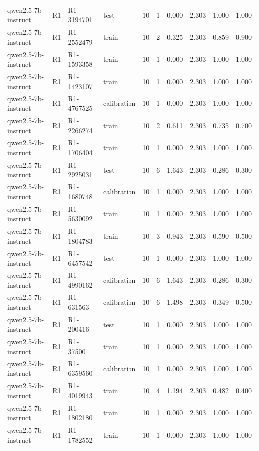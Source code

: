 \begin{table}
\begin{tabular}{llllrrrrrr}
qwen2.5-7b-instruct & R1 & R1-3194701 & test & 10 & 1 & 0.000 & 2.303 & 1.000 & 1.000 \\
qwen2.5-7b-instruct & R1 & R1-2552479 & train & 10 & 2 & 0.325 & 2.303 & 0.859 & 0.900 \\
qwen2.5-7b-instruct & R1 & R1-1593358 & train & 10 & 1 & 0.000 & 2.303 & 1.000 & 1.000 \\
qwen2.5-7b-instruct & R1 & R1-1423107 & train & 10 & 1 & 0.000 & 2.303 & 1.000 & 1.000 \\
qwen2.5-7b-instruct & R1 & R1-4767525 & calibration & 10 & 1 & 0.000 & 2.303 & 1.000 & 1.000 \\
qwen2.5-7b-instruct & R1 & R1-2266274 & train & 10 & 2 & 0.611 & 2.303 & 0.735 & 0.700 \\
qwen2.5-7b-instruct & R1 & R1-1706404 & train & 10 & 1 & 0.000 & 2.303 & 1.000 & 1.000 \\
qwen2.5-7b-instruct & R1 & R1-2925031 & test & 10 & 6 & 1.643 & 2.303 & 0.286 & 0.300 \\
qwen2.5-7b-instruct & R1 & R1-1680748 & calibration & 10 & 1 & 0.000 & 2.303 & 1.000 & 1.000 \\
qwen2.5-7b-instruct & R1 & R1-5630092 & train & 10 & 1 & 0.000 & 2.303 & 1.000 & 1.000 \\
qwen2.5-7b-instruct & R1 & R1-1804783 & train & 10 & 3 & 0.943 & 2.303 & 0.590 & 0.500 \\
qwen2.5-7b-instruct & R1 & R1-6457542 & test & 10 & 1 & 0.000 & 2.303 & 1.000 & 1.000 \\
qwen2.5-7b-instruct & R1 & R1-4990162 & calibration & 10 & 6 & 1.643 & 2.303 & 0.286 & 0.300 \\
qwen2.5-7b-instruct & R1 & R1-631563 & calibration & 10 & 6 & 1.498 & 2.303 & 0.349 & 0.500 \\
qwen2.5-7b-instruct & R1 & R1-200416 & test & 10 & 1 & 0.000 & 2.303 & 1.000 & 1.000 \\
qwen2.5-7b-instruct & R1 & R1-37500 & train & 10 & 1 & 0.000 & 2.303 & 1.000 & 1.000 \\
qwen2.5-7b-instruct & R1 & R1-6359560 & calibration & 10 & 1 & 0.000 & 2.303 & 1.000 & 1.000 \\
qwen2.5-7b-instruct & R1 & R1-4019943 & train & 10 & 4 & 1.194 & 2.303 & 0.482 & 0.400 \\
qwen2.5-7b-instruct & R1 & R1-1802180 & train & 10 & 1 & 0.000 & 2.303 & 1.000 & 1.000 \\
qwen2.5-7b-instruct & R1 & R1-1782552 & train & 10 & 1 & 0.000 & 2.303 & 1.000 & 1.000 \\

\end{tabular}
\end{table}
